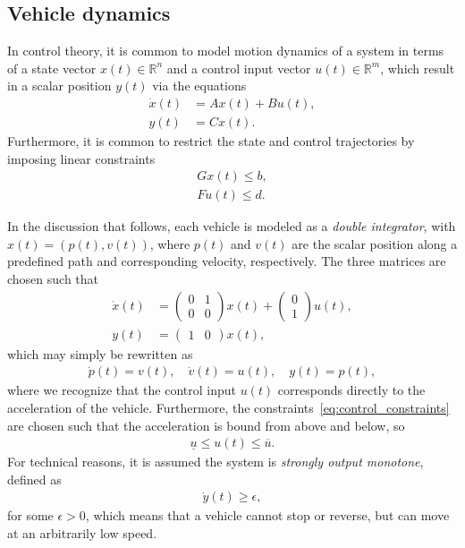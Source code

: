 \documentclass{article}
\author{Jeroen van Riel}
\date{\monthyeardate\today}
\title{}
\theoremstyle{definition}
\theoremstyle{plain}
\begin{document}
\subsection*{Vehicle dynamics}

In control theory, it is common to model motion dynamics of a system in terms of
a state vector $x(t) \in \mathbb{R}^{n}$ and a control input vector
$u(t) \in \mathbb{R}^{m}$, which result in a scalar position $y(t)$ via the
equations
\begin{subequations}
\begin{align}
  \dot{x}(t) &= A x(t) + B u(t) , \\
  y(t) &= C x(t) .
\end{align}
\end{subequations}
%
Furthermore, it is common to restrict the state and control trajectories by
imposing linear constraints
\begin{subequations}\label{eq:control_constraints}
\begin{align}
  G x(t) \leq b , \\
  F u(t) \leq d .
\end{align}
\end{subequations}

In the discussion that follows, each vehicle is modeled as a \textit{double
  integrator}, with $x(t) = (p(t), v(t))$, where $p(t)$ and $v(t)$ are the
scalar position along a predefined path and corresponding velocity,
respectively. The three matrices are chosen such that
\begin{subequations}
\begin{align}
  \dot{x}(t) &= \begin{pmatrix} 0 & 1 \\ 0 & 0 \end{pmatrix} x(t) + \begin{pmatrix} 0 \\ 1 \end{pmatrix} u(t), \\
  y(t) &= \begin{pmatrix} 1 & 0 \end{pmatrix} x(t),
\end{align}
\end{subequations}
which may simply be rewritten as
\begin{align}
  \label{eq:motion_dynamics}
  \dot{p}(t) = v(t) , \quad
  \dot{v}(t) = u(t) , \quad
  y(t) = p(t) ,
\end{align}
where we recognize that the control input $u(t)$ corresponds directly to the
acceleration of the vehicle.
%
Furthermore, the constraints~\eqref{eq:control_constraints} are chosen such that
the acceleration is bound from above and below, so
\begin{align}
  \label{eq:bounded_acceleration}
  \underline{u} \leq u(t) \leq \overline{u} .
\end{align}
For technical reasons, it is assumed the system is \textit{strongly output
  monotone}, defined as
\begin{align}
  \label{eq:output_monotone}
  \dot{y}(t) \geq \epsilon ,
\end{align}
for some $\epsilon > 0$, which means that a vehicle cannot stop or reverse, but
can move at an arbitrarily low speed.
\end{document}
